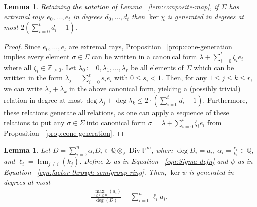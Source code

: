 \documentclass{amsart}
\theoremstyle{plain}
\newtheorem{lem}[thm]{Lemma}
\theoremstyle{definition}
\theoremstyle{remark}
\numberwithin{equation}{section}
\newcommand\bq{{\mathbb Q}}
\newcommand\bp{{\mathbb P}}
\newcommand\bz{{\mathbb Z}}
\DeclareMathOperator\di{Div}
\newcommand\bida{a}
\DeclareMathOperator{\lcm}{lcm}
\begin{document}
\begin{lem}
\label{lem:bound-ker-chi}
Retaining the notation of Lemma ~\ref{lem:composite-map}, if $\Sigma$ has
extremal rays $e_0,\ldots, e_t$ in degrees $d_0, \ldots, d_t$ then $\ker \chi$
is generated in degrees at most $2(\sum_{i=0}^{t}d_i-1)$.
\end{lem}
\begin{proof}
Since $e_0, \ldots, e_t$ are extremal rays, Proposition
~\ref{prop:cone-generation} implies every element $\sigma \in \Sigma$ can be written
in a canonical form $\lambda + \sum_{i=0}^{t} \zeta_i e_i$ where all $\zeta_i \in \mathbb{Z}_{\ge 0}$.  Let
$\lambda_0 :=
0,\lambda_1, \ldots, \lambda_r$ be all elements of $\Sigma$ which
can be
written in the form $\lambda_j = \sum_{i=0}^{t}s_i e_i$ with $0
\leq s_i < 1.$ Then, for any $1 \leq j \leq k \leq r,$ we can write $\lambda_j + \lambda_k$ in
the above canonical form, yielding a (possibly trivial) relation in degree at most $\deg \lambda_j
+ \deg \lambda_k\leq 2 \cdot \left( \sum_{i=0}^{t}d_i -1 \right).$
Furthermore, these relations generate all relations, as one can apply a
sequence of these relations to put any $\sigma \in \Sigma$ into canonical form
$\sigma = \lambda + \sum_{i=0}^{t}\zeta_i e_i$ from Proposition
~\ref{prop:cone-generation}.
\end{proof}
\begin{lem}
\label{lem:proj-relations-psi}
Let $D = \sum_{i=0}^{n} \alpha_i D_i \in \bq \otimes_\bz \di \bp^m$, where
$\deg D_i = \bida_i$, $\alpha_i = \frac{c_i}{k_i}\in \bq$, and
$\ell_i = \lcm_{j \neq i} (k_j)$. Define $\Sigma$ as in Equation
~\eqref{eqn:Sigma-defn} and $\psi$ as in Equation
~\eqref{eqn:factor-through-semigroup-ring}. Then, $\ker \psi$ is
generated in degrees at most
\begin{align}
\label{eqn:proj-relation-degree}
	\frac{\max_{0\le i \le n}(\bida_i)}{\deg(D)} +  \sum_{i=0}^n \ell_i a_i.
\end{align}

\end{lem}
\end{document}
